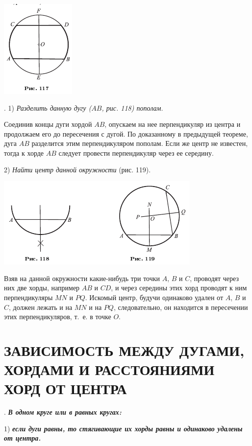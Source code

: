 \documentclass[oneside]{book}
\begin{document}
\includegraphics{pics/ris-117}

.
1) \emph{Разделить данную дугу \emph{($AB$, рис. 118)} пополам.}

Соединив концы дуги хордой $AB$, опускаем на нее перпендикуляр из центра и продолжаем его до пересечения с дугой.
По доказанному в предыдущей теореме, дуга $AB$ разделится этим перпендикуляром пополам.
Если же центр не известен, тогда к хорде $AB$ следует провести перпендикуляр через ее середину.

2) \emph{Найти центр данной окружности} (рис. 119).

\includegraphics{pics/ris-118-119}

Взяв на данной окружности какие-нибудь три точки $A$, $B$ и $C$, проводят через них две хорды, например $AB$ и $CD$, и через середины этих хорд проводят к ним перпендикуляры $MN$ и $PQ$.
Искомый центр, будучи одинаково удален от $A$, $B$ и $C$, должен лежать и на $MN$ и на $PQ$, следовательно, он находится в пересечении этих перпендикуляров, т.~е. в точке $O$.

\section{ЗАВИСИМОСТЬ МЕЖДУ ДУГАМИ,\\ ХОРДАМИ И РАССТОЯНИЯМИ ХОРД ОТ ЦЕНТРА}

.
\textbf{\emph{В одном круге или в равных кругах:}}

1) \textbf{\emph{если дуги равны, то стягивающие их хорды равны и одинаково удалены от центра.}}
\end{document}
